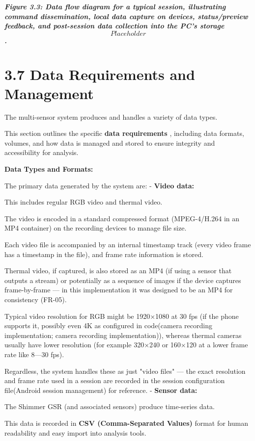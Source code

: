 \textit{\textbf{Figure 3.3: Data flow diagram for a typical session, illustrating command dissemination, local data capture on devices, status/preview feedback, and post-session data collection into the PC's storage \[Placeholder\].}
} \section{3.7 Data Requirements and Management}

The multi-sensor system produces and handles a variety of data types.

This section outlines the specific \textbf{data requirements}
, including data formats, volumes, and how data is managed and stored to ensure
integrity and accessibility for analysis.

\textbf{Data Types and Formats:}

The primary data generated by the system are: - \textbf{Video data:}

This includes regular RGB video and thermal video.

The video is encoded in a standard compressed format (MPEG-4/H.264 in an MP4
container) on the recording devices to manage file size.

Each video file is accompanied by an internal timestamp track (every video frame has
a timestamp in the file), and frame rate information is stored.

Thermal video, if captured, is also stored as an MP4 (if using a sensor that outputs
a stream) or potentially as a sequence of images if the device captures
frame-by-frame --- in this implementation it was designed to be an MP4 for
consistency (FR-05).

Typical video resolution for RGB might be 1920×1080 at 30 fps (if the phone supports
it, possibly even 4K as configured in code(camera recording implementation; camera
recording implementation)), whereas thermal cameras usually have lower resolution
(for example 320×240 or 160×120 at a lower frame rate like 8---30 fps).

Regardless, the system handles these as just "video files" --- the exact resolution
and frame rate used in a session are recorded in the session configuration
file(Android session management) for reference.  - \textbf{Sensor data:}

The Shimmer GSR (and associated sensors) produce time-series data.

This data is recorded in \textbf{CSV (Comma-Separated Values)}
 format for human readability and easy import into analysis tools.

